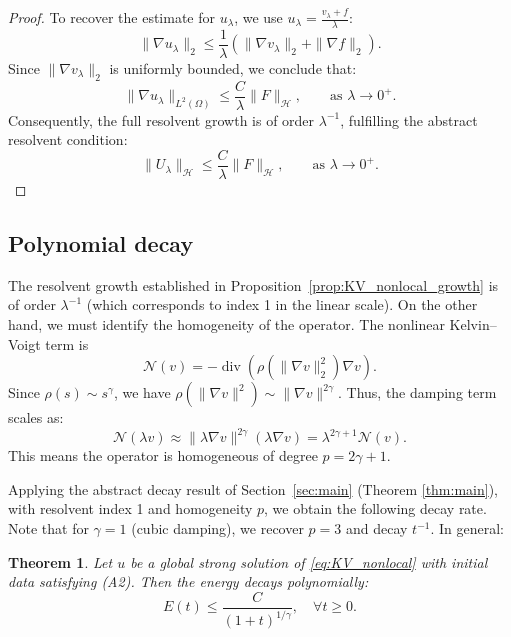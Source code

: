 \documentclass[11pt,reqno]{amsart}
\newtheorem{theorem}{Theorem}[section]
\theoremstyle{remark}
\begin{document}
\begin{proof}
To recover the estimate for $u_\lambda$, we use $u_\lambda = \frac{v_\lambda+f}{\lambda}$:
\begin{equation}
\|\nabla u_\lambda\|_2 \le \frac{1}{\lambda} \left( \|\nabla v_\lambda\|_2 + \|\nabla f\|_2 \right).
\end{equation}
Since $\|\nabla v_\lambda\|_2$ is uniformly bounded, we conclude that:
\begin{equation}
\|\nabla u_\lambda\|_{L^2(\Omega)} \le \frac{C}{\lambda}\|F\|_{\mathcal{H}}, \qquad \text{as } \lambda\to0^+.
\end{equation}
Consequently, the full resolvent growth is of order $\lambda^{-1}$, fulfilling the abstract resolvent condition:
\begin{equation}
\|U_\lambda\|_{\mathcal H}\le \frac{C}{\lambda} \|F\|_{\mathcal H}, \qquad \text{as } \lambda\to0^+.
\end{equation}
\end{proof}



\subsection{Polynomial decay}
\label{subsec:KV_nonlocal_decay}

The resolvent growth established in Proposition~\ref{prop:KV_nonlocal_growth} is of order
$\lambda^{-1}$ (which corresponds to index 1 in the linear scale).
On the other hand, we must identify the homogeneity of the operator. The nonlinear Kelvin--Voigt term is
\[
\mathcal{N}(v) = -\operatorname{div}\left(\rho(\|\nabla v\|_2^2)\nabla v\right).
\]
Since $\rho(s) \sim s^\gamma$, we have $\rho(\|\nabla v\|^2) \sim \|\nabla v\|^{2\gamma}$. Thus, the damping term scales as:
\[
\mathcal{N}(\lambda v) \approx \|\lambda \nabla v\|^{2\gamma} (\lambda \nabla v) = \lambda^{2\gamma+1} \mathcal{N}(v).
\]
This means the operator is homogeneous of degree $p=2\gamma+1$.

Applying the abstract decay result of Section~\ref{sec:main} (Theorem \ref{thm:main}), with resolvent index 1 and homogeneity $p$, we obtain the following decay rate. Note that for $\gamma=1$ (cubic damping), we recover $p=3$ and decay $t^{-1}$. In general:

\begin{theorem}\label{thm:KV_nonlocal_decay}
Let $u$ be a global strong solution of \eqref{eq:KV_nonlocal} with initial data satisfying (A2).
Then the energy decays polynomially:
\[
E(t)\le \frac{C}{(1+t)^{1/\gamma}}, \quad \forall t \ge 0.
\]
\end{theorem}
\end{document}
